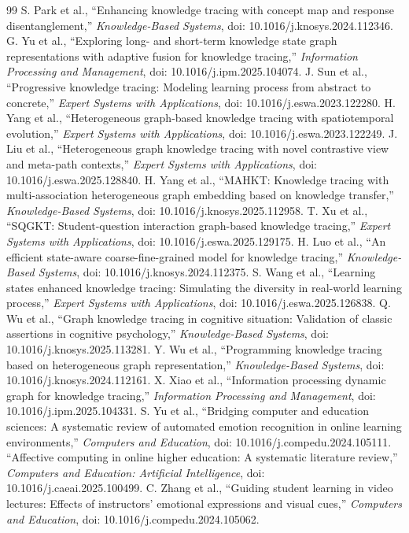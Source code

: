 \documentclass[conference]{IEEEtran}
\begin{document}
\begin{thebibliography}{99}
 S. Park et al., ``Enhancing knowledge tracing with concept map and response disentanglement,'' \emph{Knowledge-Based Systems}, doi: 10.1016/j.knosys.2024.112346.
 G. Yu et al., ``Exploring long- and short-term knowledge state graph representations with adaptive fusion for knowledge tracing,'' \emph{Information Processing and Management}, doi: 10.1016/j.ipm.2025.104074.
 J. Sun et al., ``Progressive knowledge tracing: Modeling learning process from abstract to concrete,'' \emph{Expert Systems with Applications}, doi: 10.1016/j.eswa.2023.122280.
 H. Yang et al., ``Heterogeneous graph-based knowledge tracing with spatiotemporal evolution,'' \emph{Expert Systems with Applications}, doi: 10.1016/j.eswa.2023.122249.
 J. Liu et al., ``Heterogeneous graph knowledge tracing with novel contrastive view and meta-path contexts,'' \emph{Expert Systems with Applications}, doi: 10.1016/j.eswa.2025.128840.
 H. Yang et al., ``MAHKT: Knowledge tracing with multi-association heterogeneous graph embedding based on knowledge transfer,'' \emph{Knowledge-Based Systems}, doi: 10.1016/j.knosys.2025.112958.
 T. Xu et al., ``SQGKT: Student-question interaction graph-based knowledge tracing,'' \emph{Expert Systems with Applications}, doi: 10.1016/j.eswa.2025.129175.
 H. Luo et al., ``An efficient state-aware coarse-fine-grained model for knowledge tracing,'' \emph{Knowledge-Based Systems}, doi: 10.1016/j.knosys.2024.112375.
 S. Wang et al., ``Learning states enhanced knowledge tracing: Simulating the diversity in real-world learning process,'' \emph{Expert Systems with Applications}, doi: 10.1016/j.eswa.2025.126838.
 Q. Wu et al., ``Graph knowledge tracing in cognitive situation: Validation of classic assertions in cognitive psychology,'' \emph{Knowledge-Based Systems}, doi: 10.1016/j.knosys.2025.113281.
 Y. Wu et al., ``Programming knowledge tracing based on heterogeneous graph representation,'' \emph{Knowledge-Based Systems}, doi: 10.1016/j.knosys.2024.112161.
 X. Xiao et al., ``Information processing dynamic graph for knowledge tracing,'' \emph{Information Processing and Management}, doi: 10.1016/j.ipm.2025.104331.
 S. Yu et al., ``Bridging computer and education sciences: A systematic review of automated emotion recognition in online learning environments,'' \emph{Computers and Education}, doi: 10.1016/j.compedu.2024.105111.
 ``Affective computing in online higher education: A systematic literature review,'' \emph{Computers and Education: Artificial Intelligence}, doi: 10.1016/j.caeai.2025.100499.
 C. Zhang et al., ``Guiding student learning in video lectures: Effects of instructors' emotional expressions and visual cues,'' \emph{Computers and Education}, doi: 10.1016/j.compedu.2024.105062.
\end{thebibliography}
\end{document}
